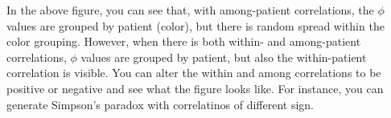 \documentclass{article}
\begin{document}
In the above figure, you can see that, with among-patient correlations, the $\phi$ values are grouped by patient (color), but there is random spread within the color grouping. However, when there is both within- and among-patient correlations, $\phi$ values are grouped by patient, but also the within-patient correlation is visible. You can alter the within and among correlations to be positive or negative and see what the figure looks like. For instance, you can generate Simpson's paradox with correlatinos of different sign. 
\end{document}
